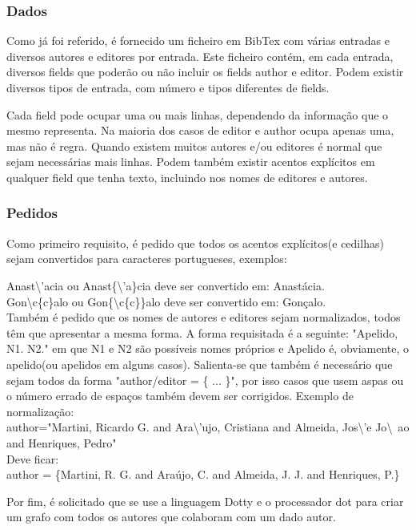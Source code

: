 \documentclass{report}
\begin{document}
\subsubsection{Dados}
Como já foi referido, é fornecido um ficheiro em BibTex com várias entradas 
e diversos autores e editores por entrada. Este ficheiro contém, em 
cada entrada, diversos fields que poderão ou não incluir os fields author 
e editor. Podem existir
diversos tipos de entrada, com número e tipos diferentes de fields.\par
Cada field pode ocupar uma ou mais linhas, dependendo da informação que 
o mesmo representa. Na maioria dos casos de editor
e author ocupa apenas uma, mas não é regra. Quando existem muitos 
autores e/ou editores é normal que sejam necessárias mais linhas. 
Podem também existir acentos explícitos em qualquer field que tenha 
texto, incluindo nos nomes de editores e autores.

\subsubsection{Pedidos}
Como primeiro requisito, é pedido que todos os acentos explícitos(e cedilhas) 
sejam convertidos para caracteres portugueses, exemplos:\par
Anast\textbackslash'acia ou Anast\{\textbackslash'a\}cia deve ser convertido 
em: Anastácia. \\
Gon\textbackslash c\{c\}alo ou Gon\{\textbackslash c\{c\}\}alo deve ser 
convertido em: Gonçalo. \\
Também é pedido que os nomes de autores e editores sejam normalizados, 
todos têm que apresentar a mesma forma.
A forma requisitada é a seguinte: "Apelido, N1. N2." em que N1 e N2 são 
possíveis nomes próprios e Apelido é, obviamente, o apelido(ou apelidos 
em alguns casos). Salienta-se que também é 
necessário que sejam todos da forma
"author/editor = \{ ... \}", por isso casos que usem aspas ou o número errado 
de espaços também devem ser corrigidos. Exemplo de normalização: \\
author="Martini, Ricardo G. and Ara{\textbackslash’u}jo, Cristiana and Almeida, 
Jos{\textbackslash’e} Jo{\textbackslash~a}o and Henriques, Pedro" \\
Deve ficar: \\
author = \{Martini, R. G. and Araújo, C. and Almeida, J. J. and Henriques, P.\}\par
Por fim, é solicitado que se use a linguagem Dotty e o processador dot para criar 
um grafo com todos os autores que colaboram com um dado autor.
\end{document}
